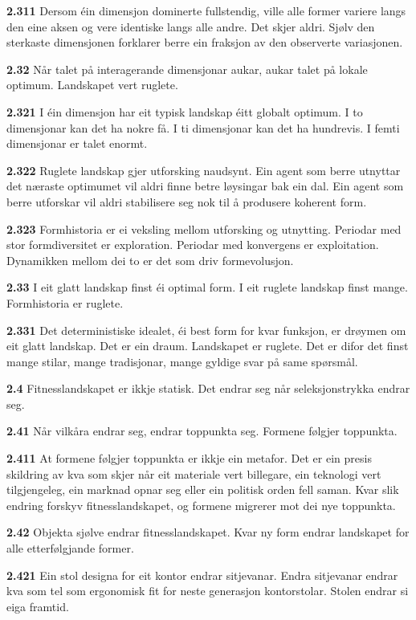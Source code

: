 \documentclass[11pt, a4paper]{article}
\newcommand{\subprop}[1]{\medskip\noindent\textbf{#1}\quad}
\begin{document}
\subprop{2.311} Dersom \'ein dimensjon dominerte fullstendig, ville alle former variere langs den eine aksen og vere identiske langs alle andre. Det skjer aldri. Sj\o lv den sterkaste dimensjonen forklarer berre ein fraksjon av den observerte variasjonen.

\subprop{2.32} N\aa r talet p\aa{} interagerande dimensjonar aukar, aukar talet p\aa{} lokale optimum. Landskapet vert ruglete.

\subprop{2.321} I \'ein dimensjon har eit typisk landskap \'eitt globalt optimum. I to dimensjonar kan det ha nokre f\aa. I ti dimensjonar kan det ha hundrevis. I femti dimensjonar er talet enormt.

\subprop{2.322} Ruglete landskap gjer utforsking naudsynt. Ein agent som berre utnyttar det n\ae raste optimumet vil aldri finne betre l\o ysingar bak ein dal. Ein agent som berre utforskar vil aldri stabilisere seg nok til \aa{} produsere koherent form.

\subprop{2.323} Formhistoria er ei veksling mellom utforsking og utnytting. Periodar med stor formdiversitet er exploration. Periodar med konvergens er exploitation. Dynamikken mellom dei to er det som driv formevolusjon.

\subprop{2.33} I eit glatt landskap finst \'ei optimal form. I eit ruglete landskap finst mange. Formhistoria er ruglete.

\subprop{2.331} Det deterministiske idealet, \'ei best form for kvar funksjon, er dr\o ymen om eit glatt landskap. Det er ein draum. Landskapet er ruglete. Det er difor det finst mange stilar, mange tradisjonar, mange gyldige svar p\aa{} same sp\o rsm\aa l.

\subprop{2.4} Fitnesslandskapet er ikkje statisk. Det endrar seg n\aa r seleksjonstrykka endrar seg.

\subprop{2.41} N\aa r vilk\aa ra endrar seg, endrar toppunkta seg. Formene f\o lgjer toppunkta.

\subprop{2.411} At formene f\o lgjer toppunkta er ikkje ein metafor. Det er ein presis skildring av kva som skjer n\aa r eit materiale vert billegare, ein teknologi vert tilgjengeleg, ein marknad opnar seg eller ein politisk orden fell saman. Kvar slik endring forskyv fitnesslandskapet, og formene migrerer mot dei nye toppunkta.

\subprop{2.42} Objekta sj\o lve endrar fitnesslandskapet. Kvar ny form endrar landskapet for alle etterf\o lgjande former.

\subprop{2.421} Ein stol designa for eit kontor endrar sitjevanar. Endra sitjevanar endrar kva som tel som ergonomisk fit for neste generasjon kontorstolar. Stolen endrar si eiga framtid.
\end{document}
